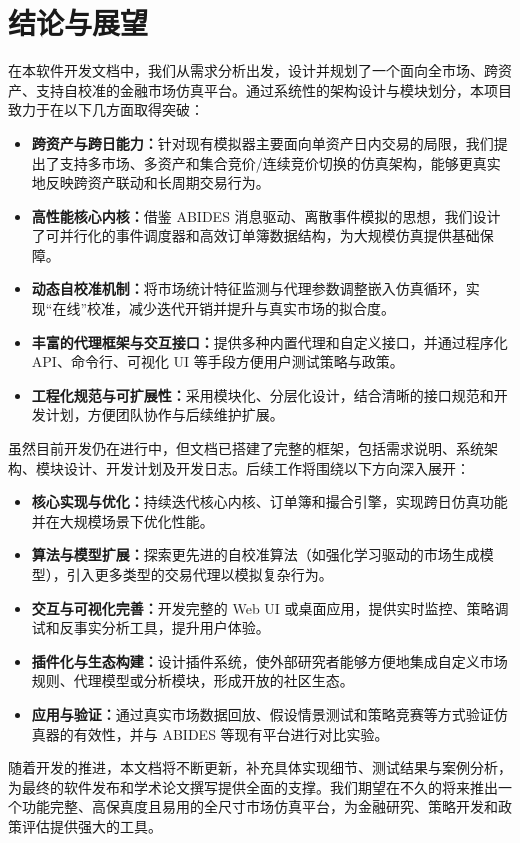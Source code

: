 \section{结论与展望}

在本软件开发文档中，我们从需求分析出发，设计并规划了一个面向全市场、跨资产、支持自校准的金融市场仿真平台。通过系统性的架构设计与模块划分，本项目致力于在以下几方面取得突破：

\begin{itemize}
  \item \textbf{跨资产与跨日能力：}针对现有模拟器主要面向单资产日内交易的局限，我们提出了支持多市场、多资产和集合竞价/连续竞价切换的仿真架构，能够更真实地反映跨资产联动和长周期交易行为。
  \item \textbf{高性能核心内核：}借鉴 ABIDES 消息驱动、离散事件模拟的思想，我们设计了可并行化的事件调度器和高效订单簿数据结构，为大规模仿真提供基础保障。
  \item \textbf{动态自校准机制：}将市场统计特征监测与代理参数调整嵌入仿真循环，实现“在线”校准，减少迭代开销并提升与真实市场的拟合度。
  \item \textbf{丰富的代理框架与交互接口：}提供多种内置代理和自定义接口，并通过程序化 API、命令行、可视化 UI 等手段方便用户测试策略与政策。
  \item \textbf{工程化规范与可扩展性：}采用模块化、分层化设计，结合清晰的接口规范和开发计划，方便团队协作与后续维护扩展。
\end{itemize}

虽然目前开发仍在进行中，但文档已搭建了完整的框架，包括需求说明、系统架构、模块设计、开发计划及开发日志。后续工作将围绕以下方向深入展开：

\begin{itemize}
  \item \textbf{核心实现与优化：}持续迭代核心内核、订单簿和撮合引擎，实现跨日仿真功能并在大规模场景下优化性能。
  \item \textbf{算法与模型扩展：}探索更先进的自校准算法（如强化学习驱动的市场生成模型），引入更多类型的交易代理以模拟复杂行为。
  \item \textbf{交互与可视化完善：}开发完整的 Web UI 或桌面应用，提供实时监控、策略调试和反事实分析工具，提升用户体验。
  \item \textbf{插件化与生态构建：}设计插件系统，使外部研究者能够方便地集成自定义市场规则、代理模型或分析模块，形成开放的社区生态。
  \item \textbf{应用与验证：}通过真实市场数据回放、假设情景测试和策略竞赛等方式验证仿真器的有效性，并与 ABIDES 等现有平台进行对比实验。
\end{itemize}

随着开发的推进，本文档将不断更新，补充具体实现细节、测试结果与案例分析，为最终的软件发布和学术论文撰写提供全面的支撑。我们期望在不久的将来推出一个功能完整、高保真度且易用的全尺寸市场仿真平台，为金融研究、策略开发和政策评估提供强大的工具。